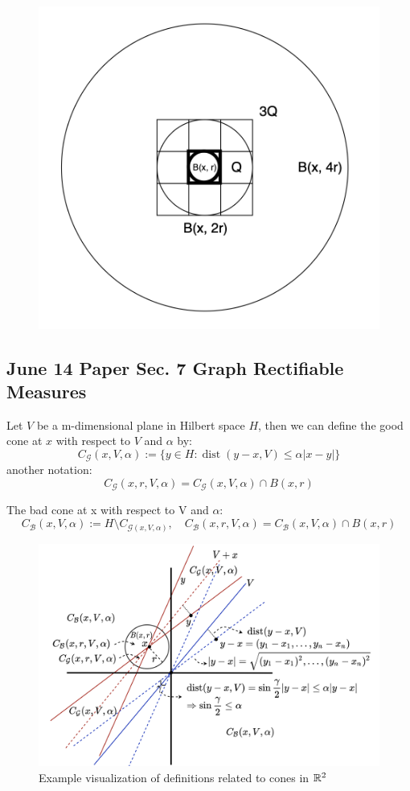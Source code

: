 \begin{figure}[H]
    \centering
    \includegraphics[width=.66\textwidth]{images/doubleMcube.png}
\end{figure}


\newpage
\subsection{June 14 Paper \texorpdfstring{\cite{naples2020}}{Lg} Sec. 7 Graph Rectifiable Measures}

\begin{definition}
    Let $V$ be a m-dimensional plane in Hilbert space $H$, then we can define the good cone at $x$ with respect to $V$ and $\alpha$ by:
    $$
    C_\mathcal{G}(x, V, \alpha) := \{y\in H: \operatorname{dist}(y-x, V) \leq \alpha |x-y|\}
    $$
    another notation:
    $$
    C_\mathcal{G}(x, r, V, \alpha) = C_\mathcal{G}(x, V, \alpha) \cap B(x, r)
    $$
\end{definition}
\begin{definition}
    The bad cone at x with respect to V and $\alpha$:
    $$
    C_\mathcal{B}(x, V, \alpha) := H\setminus C_{\mathcal{G}(x, V, \alpha)}, \quad C_\mathcal{B}(x, r, V, \alpha) = C_\mathcal{B}(x, V, \alpha) \cap B(x, r)
    $$
\end{definition}


\begin{figure}[H]
    \centering
    \includegraphics[width=.8\textwidth]{images/conedef.png}
    \caption{Example visualization of definitions related to cones in $\mathbb{R}^2$}
\end{figure}

